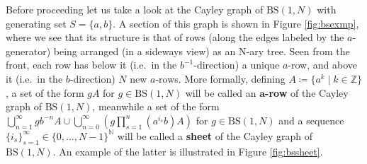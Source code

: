 \documentclass[letterpaper,10pt]{article}
\theoremstyle{plain}
\newcommand{\BS}[1][N]{\mathrm{BS}(1,#1)}
\begin{document}
Before proceeding let us take a look at the Cayley graph of $\BS$ with generating set $S=\{a,b\}$. A section of this graph is shown in Figure \ref{fig:bsexmp}, where we see that its structure is that of rows (along the edges labeled by the $a$-generator) being arranged (in a sideways view) as an N-ary tree. Seen from the front, each row has below it (i.e.\ in the $b^{-1}$-direction) a unique $a$-row, and above it (i.e.\ in the $b$-direction) $N$ new $a$-rows. More formally, defining $A\coloneqq\{a^k \mid k\in\mathbb{Z}\}$, a set of the form $gA$ for $g\in \BS$ will be called an $\mathbf{a}$\textbf{-row} of the Cayley graph of $\BS$, meanwhile a set of the form $\displaystyle\bigcup_{n=1}^{\infty}gb^{-n}A  \cup\bigcup_{n=0}^\infty\left( g\prod_{s=1}^{n}(a^{i_s}b)A \right)$ for $g\in \BS$ and a sequence $\{i_s\}_{s=1}^{\infty}\in \{0,\ldots,N-1\}^{\mathbb{N}}$ will be called a \textbf{sheet} of the Cayley graph of $\BS$. An example of the latter is illustrated in Figure \ref{fig:bssheet}.
\end{document}
